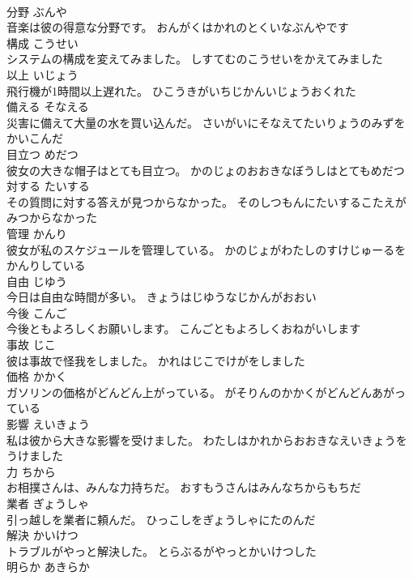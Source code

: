 \documentclass[8pt]{extreport}
\begin{document}
\begin{CJK}{UTF8}{min}
\\	分野	ぶんや	
\\	音楽は彼の得意な分野です。	おんがくはかれのとくいなぶんやです	
\\	構成	こうせい	
\\	システムの構成を変えてみました。	しすてむのこうせいをかえてみました	
\\	以上	いじょう	
\\	飛行機が1時間以上遅れた。	ひこうきがいちじかんいじょうおくれた	
\\	備える	そなえる	
\\	災害に備えて大量の水を買い込んだ。	さいがいにそなえてたいりょうのみずをかいこんだ	
\\	目立つ	めだつ	
\\	彼女の大きな帽子はとても目立つ。	かのじょのおおきなぼうしはとてもめだつ	
\\	対する	たいする	
\\	その質問に対する答えが見つからなかった。	そのしつもんにたいするこたえがみつからなかった	
\\	管理	かんり	
\\	彼女が私のスケジュールを管理している。	かのじょがわたしのすけじゅーるをかんりしている	
\\	自由	じゆう	
\\	今日は自由な時間が多い。	きょうはじゆうなじかんがおおい	
\\	今後	こんご	
\\	今後ともよろしくお願いします。	こんごともよろしくおねがいします	
\\	事故	じこ	
\\	彼は事故で怪我をしました。	かれはじこでけがをしました	
\\	価格	かかく	
\\	ガソリンの価格がどんどん上がっている。	がそりんのかかくがどんどんあがっている	
\\	影響	えいきょう	
\\	私は彼から大きな影響を受けました。	わたしはかれからおおきなえいきょうをうけました	
\\	力	ちから	
\\	お相撲さんは、みんな力持ちだ。	おすもうさんはみんなちからもちだ	
\\	業者	ぎょうしゃ	
\\	引っ越しを業者に頼んだ。	ひっこしをぎょうしゃにたのんだ	
\\	解決	かいけつ	
\\	トラブルがやっと解決した。	とらぶるがやっとかいけつした	
\\	明らか	あきらか	

\end{CJK}
\end{document}
